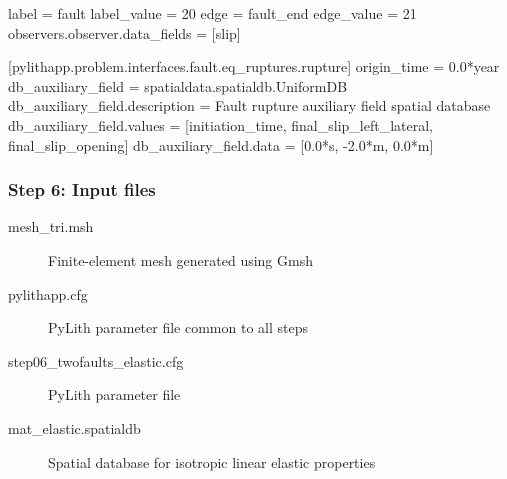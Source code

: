 \documentclass[aspectratio=169]{beamer}
\begin{document}
\begin{frame}[t,fragile]
\begin{minipage}[t]{0.67\textwidth}
\begin{onlyenv}
\begin{cfgcode}
        label = fault
        label_value = 20
        edge = fault_end
        edge_value = 21
        observers.observer.data_fields = [slip]

        [pylithapp.problem.interfaces.fault.eq_ruptures.rupture]
        origin_time = 0.0*year
        db_auxiliary_field = spatialdata.spatialdb.UniformDB
        db_auxiliary_field.description = Fault rupture auxiliary field spatial database
        db_auxiliary_field.values = [initiation_time, final_slip_left_lateral, final_slip_opening]
        db_auxiliary_field.data = [0.0*s, -2.0*m, 0.0*m]
      \end{cfgcode}
    \end{onlyenv}
  \end{minipage}

  
\end{frame}


\begin{frame}
  \frametitle{Step 6: Input files}
  \summary{}

  \begin{description}
  \item[mesh\_tri.msh] Finite-element mesh generated using Gmsh
  \item[pylithapp.cfg] PyLith parameter file common to all steps
  \item[step06\_twofaults\_elastic.cfg] PyLith parameter file
  \item[mat\_elastic.spatialdb] Spatial database for isotropic linear elastic properties
  \end{description}
    
\end{frame}
\end{document}

